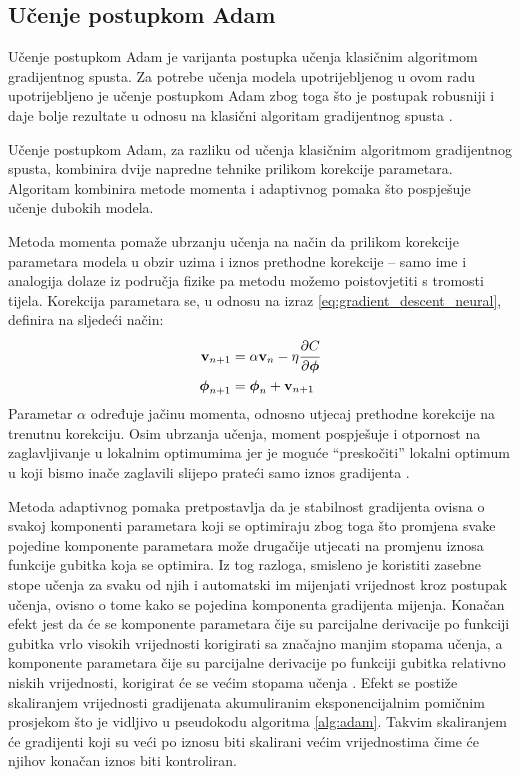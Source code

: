 \documentclass[times, utf8, diplomski, numeric]{fer}
\begin{document}
\subsection{Učenje postupkom Adam}
Učenje postupkom Adam je varijanta postupka učenja klasičnim algoritmom gradijentnog spusta.
Za potrebe učenja modela upotrijebljenog u ovom radu upotrijebljeno je učenje postupkom Adam zbog toga što je postupak robusniji i daje bolje rezultate u odnosu na klasični algoritam gradijentnog spusta \citep{article:adam}. 

Učenje postupkom Adam, za razliku od učenja klasičnim algoritmom gradijentnog spusta, kombinira dvije napredne tehnike prilikom korekcije parametara. 
Algoritam kombinira metode momenta i adaptivnog pomaka što pospješuje učenje dubokih modela.

Metoda momenta pomaže ubrzanju učenja na način da prilikom korekcije parametara modela u obzir uzima i iznos prethodne korekcije -- samo ime i analogija dolaze iz područja fizike pa metodu možemo poistovjetiti s tromosti tijela.
Korekcija parametara se, u odnosu na izraz \ref{eq:gradient_descent_neural}, definira na sljedeći način:
\begin{align}
\mathbf{v}_{n+1} &= \alpha \mathbf{v}_{n} - \eta \cfrac{\partial C}{\partial \boldsymbol{\phi}} \\
 \boldsymbol{\phi}_{n+1} &= \boldsymbol{\phi}_n + \mathbf{v}_{n+1}
\end{align} 
Parametar $\alpha$ određuje jačinu momenta, odnosno utjecaj prethodne korekcije na trenutnu korekciju.
Osim ubrzanja učenja, moment pospješuje i otpornost na zaglavljivanje u lokalnim optimumima jer je moguće ``preskočiti'' lokalni optimum u koji bismo inače zaglavili slijepo prateći samo iznos gradijenta \citep{book:deeplearningbook} \citep{seminar:rela}.

Metoda adaptivnog pomaka pretpostavlja da je stabilnost gradijenta ovisna o svakoj komponenti parametara koji se optimiraju zbog toga što promjena svake pojedine komponente parametara može drugačije utjecati na promjenu iznosa funkcije gubitka koja se optimira.
Iz tog razloga, smisleno je koristiti zasebne stope učenja za svaku od njih i automatski im mijenjati vrijednost kroz postupak učenja, ovisno o tome kako se pojedina komponenta gradijenta mijenja.
Konačan efekt jest da će se komponente parametara čije su parcijalne derivacije po funkciji gubitka vrlo visokih vrijednosti korigirati sa značajno manjim stopama učenja, a komponente parametara čije su parcijalne derivacije po funkciji gubitka relativno niskih vrijednosti, korigirat će se većim stopama učenja \citep{book:deeplearningbook} \citep{seminar:rela}.
Efekt se postiže skaliranjem vrijednosti gradijenata akumuliranim eksponencijalnim pomičnim prosjekom  što je vidljivo u pseudokodu algoritma \ref{alg:adam}. 
Takvim skaliranjem će gradijenti koji su veći po iznosu biti skalirani većim vrijednostima čime će njihov konačan iznos biti kontroliran.
\end{document}
